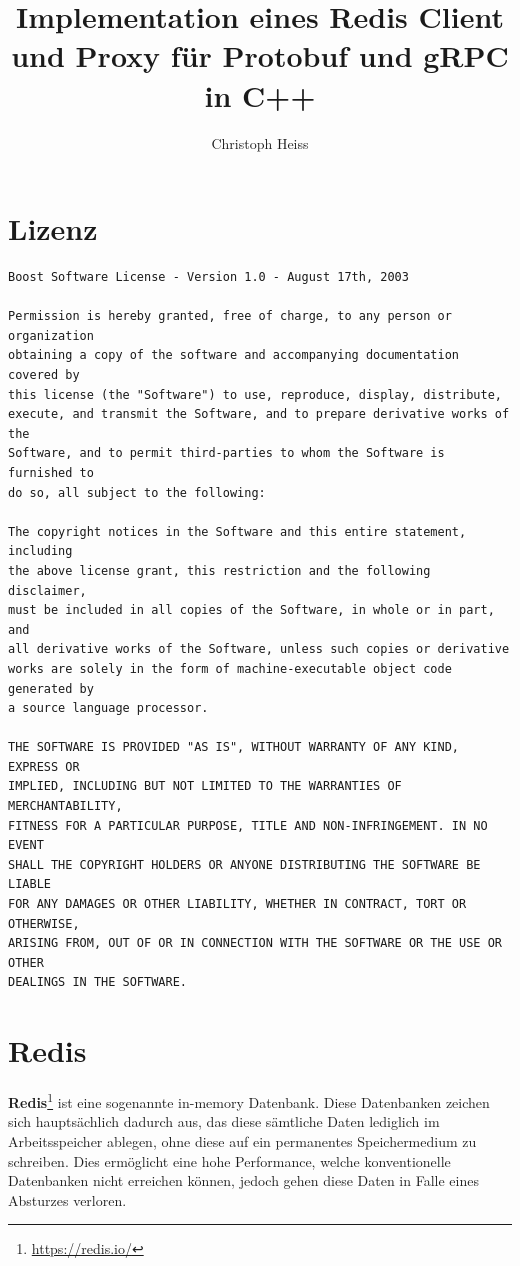 \documentclass[a4paper,ngerman]{article}
\title{Implementation eines Redis Client und Proxy für Protobuf und gRPC in C++}
\author{Christoph Heiss}
\begin{document}
\begin{titlepage}
\maketitle
\thispagestyle{empty}
\end{titlepage}

\tableofcontents
\clearpage


\section{Lizenz}
\begin{Verbatim}[fontsize=\small]
Boost Software License - Version 1.0 - August 17th, 2003

Permission is hereby granted, free of charge, to any person or organization
obtaining a copy of the software and accompanying documentation covered by
this license (the "Software") to use, reproduce, display, distribute,
execute, and transmit the Software, and to prepare derivative works of the
Software, and to permit third-parties to whom the Software is furnished to
do so, all subject to the following:

The copyright notices in the Software and this entire statement, including
the above license grant, this restriction and the following disclaimer,
must be included in all copies of the Software, in whole or in part, and
all derivative works of the Software, unless such copies or derivative
works are solely in the form of machine-executable object code generated by
a source language processor.

THE SOFTWARE IS PROVIDED "AS IS", WITHOUT WARRANTY OF ANY KIND, EXPRESS OR
IMPLIED, INCLUDING BUT NOT LIMITED TO THE WARRANTIES OF MERCHANTABILITY,
FITNESS FOR A PARTICULAR PURPOSE, TITLE AND NON-INFRINGEMENT. IN NO EVENT
SHALL THE COPYRIGHT HOLDERS OR ANYONE DISTRIBUTING THE SOFTWARE BE LIABLE
FOR ANY DAMAGES OR OTHER LIABILITY, WHETHER IN CONTRACT, TORT OR OTHERWISE,
ARISING FROM, OUT OF OR IN CONNECTION WITH THE SOFTWARE OR THE USE OR OTHER
DEALINGS IN THE SOFTWARE.
\end{Verbatim}
\clearpage


\section{Redis}
\textbf{Redis}\footnote{\url{https://redis.io/}} ist eine sogenannte in-memory Datenbank. Diese Datenbanken zeichen sich hauptsächlich dadurch aus, das diese sämtliche Daten lediglich im Arbeitsspeicher ablegen, ohne diese auf ein permanentes Speichermedium zu schreiben. Dies ermöglicht eine hohe Performance, welche konventionelle Datenbanken nicht erreichen können, jedoch gehen diese Daten in Falle eines Absturzes verloren.
\end{document}
